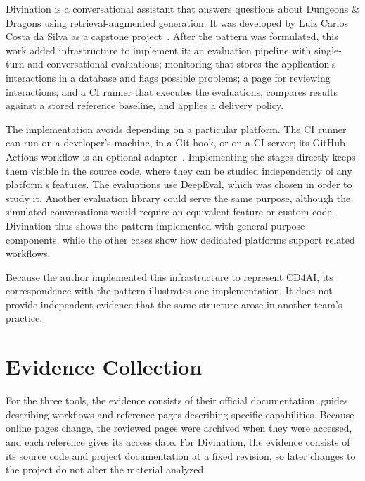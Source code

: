 Divination is a conversational assistant that answers questions about
Dungeons \& Dragons using retrieval-augmented generation. It was developed by
Luiz Carlos Costa da Silva as a capstone project~\parencite{Silva:Divination:2025}.
After the pattern was formulated, this work added infrastructure to implement
it: an evaluation pipeline with single-turn and conversational evaluations;
monitoring that stores the application's interactions in a database and flags
possible problems; a page for reviewing interactions; and a CI runner that
executes the evaluations, compares results against a stored reference baseline,
and applies a delivery policy.

The implementation avoids depending on a particular platform. The CI runner
can run on a developer's machine, in a Git hook, or on a CI server; its GitHub
Actions workflow is an optional adapter~\parencite{Divination:CI}. Implementing
the stages directly keeps them visible in the source code, where they can be
studied independently of any platform's features. The evaluations use
DeepEval, which was chosen in order to study it. Another evaluation library
could serve the same purpose, although the simulated conversations would
require an equivalent feature or custom code. Divination thus shows the
pattern implemented with general-purpose components, while the other cases
show how dedicated platforms support related workflows.

Because the author implemented this infrastructure to represent CD4AI, its
correspondence with the pattern illustrates one implementation. It does not
provide independent evidence that the same structure arose in another team's
practice.

\section{Evidence Collection}
\label{sec:method-evidence}

For the three tools, the evidence consists of their official documentation:
guides describing workflows and reference pages describing specific
capabilities. Because online pages change, the reviewed pages were archived
when they were accessed, and each reference gives its access date. For
Divination, the evidence consists of its source code and project
documentation at a fixed revision, so later changes to the project do not
alter the material analyzed.


